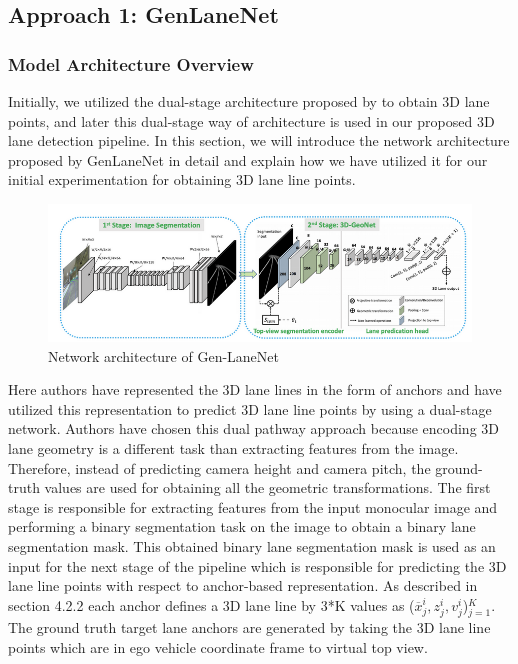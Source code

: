        \subsection{Approach 1: GenLaneNet\cite{guo2020gen}}
        
        \subsubsection{Model Architecture Overview}
        Initially, we utilized the dual-stage architecture proposed by \cite{guo2020gen} to obtain 3D lane points, and later this dual-stage way of architecture is used in our proposed 3D lane detection pipeline. In this section, we will introduce the network architecture proposed by GenLaneNet\cite{guo2020gen} in detail and explain how we have utilized it for our initial experimentation for obtaining 3D lane line points.
        
         \begin{figure}[h]
    \centering
    \includegraphics[width=13cm]{images/GenLaneNET.png}
    \caption{Network architecture of Gen-LaneNet \cite{guo2020gen}}
    \end{figure}
         
         Here authors have represented the 3D lane lines in the form of anchors and have utilized this representation to predict 3D lane line points by using a dual-stage network. Authors have chosen this dual pathway approach because encoding 3D lane geometry is a different task than extracting features from the image. Therefore, instead of predicting camera height and camera pitch, the ground-truth values are used for obtaining all the geometric transformations. 
         The first stage is responsible for extracting features from the input monocular image and performing a binary segmentation task on the image to obtain a binary lane segmentation mask. This obtained binary lane segmentation mask is used as an input for the next stage of the pipeline which is responsible for predicting the 3D lane line points with respect to anchor-based representation. As described in section 4.2.2 each anchor \cite{guo2020gen} defines a 3D lane line by 3*K values as ($\overline{x}^{i}_{j},z^{i}_{j},v^{i}_{j}$)$^{K}_{j=1}$. The ground truth target lane anchors are generated by taking the 3D lane line points which are in ego vehicle coordinate frame to virtual top view.
         
